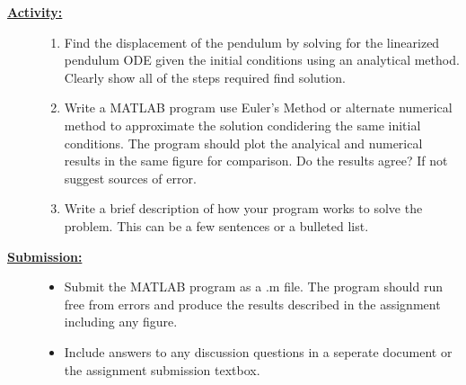 \documentclass[12pt]{article}
\newcommand{\ANUM}{7} %
\begin{document}
\begin{description}
\item[\textbf{\underline{Activity:}}] \hfill \vspace{0mm}

\begin{enumerate}	
	
	\item Find the displacement of the pendulum by solving for the linearized pendulum ODE given the initial conditions using an analytical method. Clearly show all of the steps required find solution. 

	\item Write a MATLAB program use Euler's Method or alternate numerical method to approximate the solution condidering the same initial conditions. The program should plot the analyical and numerical results in the same figure for comparison. Do the results agree? If not suggest sources of error.
	
	\item Write a brief description of how your program works to solve the problem. This can be a few sentences or a bulleted list. 

\end{enumerate}

\newpage	



\item[\textbf{\underline{Submission:}}] \hfill \vspace{0mm}

	\begin{itemize}

		\item Submit the MATLAB program as a .m file. The program should run free from errors and produce the results described in the assignment including any figure. 

		\item Include answers to any discussion questions in a seperate document or the assignment submission textbox. 

	\end{itemize}		



\end{description}
\end{document}
